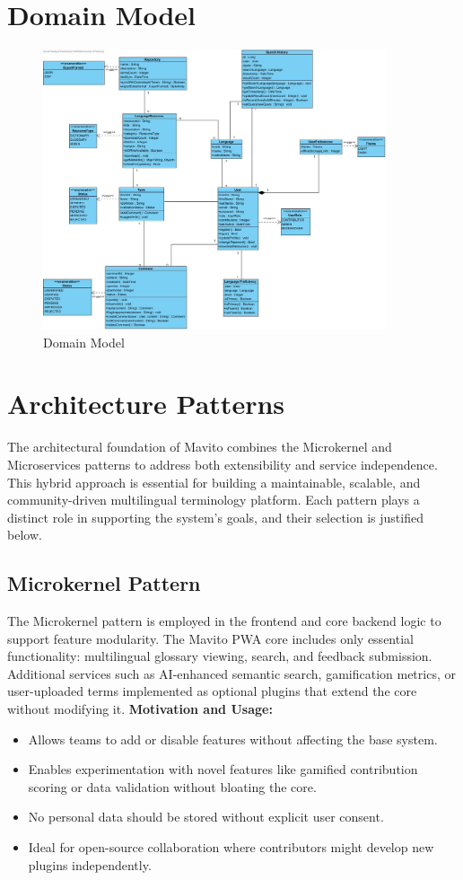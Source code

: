 \documentclass[12pt]{article}
\begin{document}
\section{Domain Model}
\begin{figure}[H]
  \centering
  \includegraphics[width=0.9\textwidth]{domain_model.jpg}
  \caption{Domain Model}
  \label{fig:domain-model}
\end{figure}

\section{Architecture Patterns}
The architectural foundation of Mavito combines the Microkernel and Microservices patterns to address both extensibility and service independence. This hybrid approach is essential for building a maintainable, scalable, and community-driven multilingual terminology platform. Each pattern plays a distinct role in supporting the system’s goals, and their selection is justified below.

\subsection{Microkernel Pattern}
The Microkernel pattern is employed in the frontend and core backend logic to support feature modularity. The Mavito PWA core includes only essential functionality: multilingual glossary viewing, search, and feedback submission. Additional services such as AI-enhanced semantic search, gamification metrics, or user-uploaded terms implemented as optional plugins that extend the core without modifying it.
\newline
\textbf{Motivation and Usage:}
\begin{itemize}
    \item Allows teams to add or disable features without affecting the base system.
    \item Enables experimentation with novel features like gamified contribution scoring or data validation without bloating the core.
    \item No personal data should be stored without explicit user consent.
    \item Ideal for open-source collaboration where contributors might develop new plugins independently.
\end{itemize}
\end{document}
